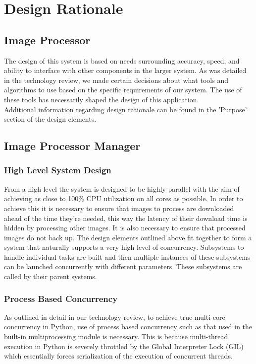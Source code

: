 \documentclass[10pt, onecolumn, draftclsnofoot, letterpaper, compsoc]{IEEEtran}
\begin{document}
\section{Design Rationale}

\subsection{Image Processor}

The design of this system is based on needs surrounding accuracy, speed, and
ability to interface with other components in the larger system. As was detailed
in the technology review, we made certain decisions about what tools and
algorithms to use based on the specific requirements of our system. The use of
these tools has necessarily shaped the design of this application.\\

Additional information regarding design rationale can be found in the 'Purpose'
section of the design elements.

\subsection{Image Processor Manager}

    \subsubsection{High Level System Design}
    From a high level the system is designed to be highly parallel with the aim of achieving as close to
    100\% CPU utilization on all cores as possible. In order to achieve this it is necessary to ensure that
    images to process are downloaded ahead of the time they're needed, this way the latency of their download
    time is hidden by processing other images. It is also necessary to ensure that processed images do not back
    up. The design elements outlined above fit together to form a system that naturally supports a very high
    level of concurrency. Subsystems to handle individual tasks are built and then multiple instances of these
    subsystems can be launched concurrently with different parameters. These subsystems are called by their
    parent systems. \\

    \subsubsection{Process Based Concurrency}
    As outlined in detail in our technology review, to achieve true multi-core concurrency in Python, use of
    process based concurrency such as that used in the built-in multiprocessing module is necessary. This is
    because multi-thread execution in Python is severely throttled by the Global Interpreter Lock (GIL) which
    essentially forces serialization of the execution of concurrent threads. \\
\end{document}
